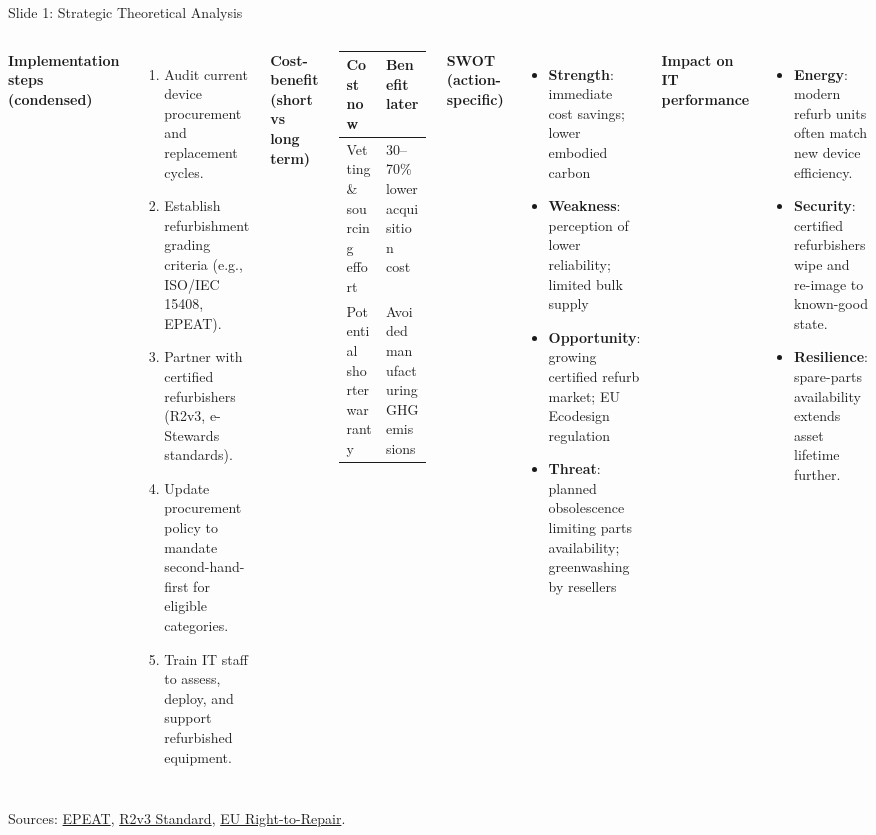 \documentclass[aspectratio=169]{beamer}
\begin{document}
\begin{frame}{Slide 1: Strategic Theoretical Analysis}
\scriptsize
\begin{columns}[T,totalwidth=\textwidth]
\textbf{Implementation steps (condensed)}
\begin{enumerate}
  \item Audit current device procurement and replacement cycles.
  \item Establish refurbishment grading criteria (e.g., ISO/IEC 15408, EPEAT).
  \item Partner with certified refurbishers (R2v3, e-Stewards standards).
  \item Update procurement policy to mandate second-hand-first for eligible categories.
  \item Train IT staff to assess, deploy, and support refurbished equipment.
\end{enumerate}

\textbf{Cost-benefit (short vs long term)}
\begin{tabular}{p{1.9cm}p{2.6cm}}
\toprule
Cost now & Benefit later \\
\midrule
Vetting \& sourcing effort & 30--70\% lower acquisition cost \\
Potential shorter warranty & Avoided manufacturing GHG emissions \\
\bottomrule
\end{tabular}

\textbf{SWOT (action-specific)}
\begin{itemize}
  \item \textbf{Strength}: immediate cost savings; lower embodied carbon
  \item \textbf{Weakness}: perception of lower reliability; limited bulk supply
  \item \textbf{Opportunity}: growing certified refurb market; EU Ecodesign regulation
  \item \textbf{Threat}: planned obsolescence limiting parts availability; greenwashing by resellers
\end{itemize}

\textbf{Impact on IT performance}
\begin{itemize}
  \item \textbf{Energy}: modern refurb units often match new device efficiency.
  \item \textbf{Security}: certified refurbishers wipe and re-image to known-good state.
  \item \textbf{Resilience}: spare-parts availability extends asset lifetime further.
\end{itemize}
\end{columns}
\vspace{0.1cm}
\tiny Sources: \href{https://www.epeat.net}{EPEAT}, \href{https://sustainableelectronics.org/r2-standard/}{R2v3 Standard}, \href{https://commission.europa.eu/law/law-topic/consumer-protection-law/directive-repair-goods_en}{EU Right-to-Repair}.
\end{frame}
\end{document}
